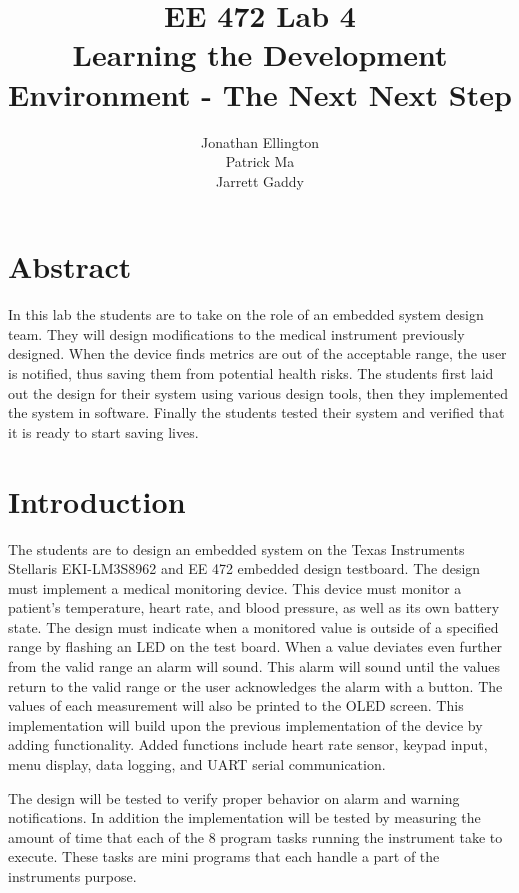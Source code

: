 \documentclass[12pt]{article} %
\title{\TitleFont EE 472 Lab 4 \\ Learning the Development Environment - The Next Next Step \vfill }
\author{\AuthorFont Jonathan Ellington \\ Patrick Ma \\ Jarrett Gaddy}
\date{}
\begin{document}
\maketitle
\thispagestyle{empty}
\pagebreak
\tableofcontents
\listoftables
\listoffigures
\thispagestyle{empty}
\pagebreak
\setcounter{page}{1}


\section{Abstract} In this lab the students are to take on the role of an
embedded system design team. They will design modifications to the medical
instrument previously designed. When the device finds metrics are out of the
acceptable range, the user is notified, thus saving them from potential health
risks. The students first laid out the design for their system using various
design tools, then they implemented the system in software. Finally the
students tested their system and verified that it is ready to start saving
lives. 

\section{Introduction} The students are to design an embedded system on the
Texas Instruments Stellaris EKI-LM3S8962 and EE 472 embedded design testboard.
The design must implement a medical monitoring device. This device must monitor
a patient's temperature, heart rate, and blood pressure, as well as its own
battery state.  The design must indicate when a monitored value is outside of a
specified range by flashing an LED on the test board. When a value deviates
even further from the valid range an alarm will sound. This alarm will sound
until the values return to the valid range or the user acknowledges the alarm
with a button. The values of each measurement will also be printed to the OLED
screen. This implementation will build upon the previous implementation of the
device by adding functionality. Added functions include heart rate sensor,
keypad input, menu display, data logging, and UART serial communication.

The design will be tested to verify proper behavior on alarm and warning
notifications. In addition the implementation will be tested by measuring the
amount of time that each of the 8 program tasks running the instrument take to
execute. These tasks are mini programs that each handle a part of the
instruments purpose.
\end{document}
